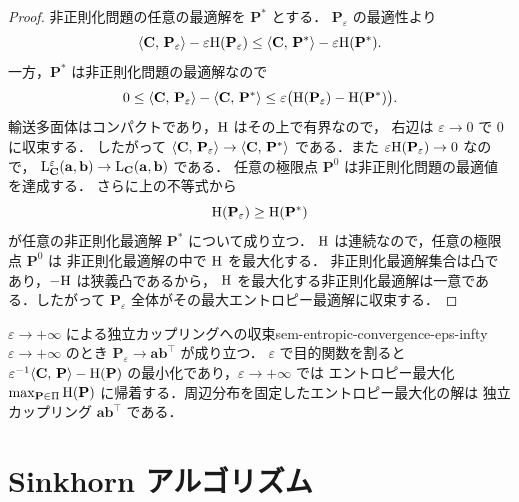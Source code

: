 \begin{proof}
  非正則化問題の任意の最適解を $\mathbf{P}^*$ とする．
  $\mathbf{P}_\varepsilon$ の最適性より
  \[
    \langle \mathbf{C},\, \mathbf{P}_\varepsilon \rangle
    - \varepsilon\mathrm{H}(\mathbf{P}_\varepsilon)
    \leq
    \langle \mathbf{C},\, \mathbf{P}^* \rangle
    - \varepsilon\mathrm{H}(\mathbf{P}^*).
  \]
  一方，$\mathbf{P}^*$ は非正則化問題の最適解なので
  \[
    0
    \leq
    \langle \mathbf{C},\, \mathbf{P}_\varepsilon \rangle
    - \langle \mathbf{C},\, \mathbf{P}^* \rangle
    \leq
    \varepsilon\bigl(\mathrm{H}(\mathbf{P}_\varepsilon)-\mathrm{H}(\mathbf{P}^*)\bigr).
  \]
  輸送多面体はコンパクトであり，$\mathrm{H}$ はその上で有界なので，
  右辺は $\varepsilon \to 0$ で $0$ に収束する．
  したがって
  $\langle \mathbf{C},\, \mathbf{P}_\varepsilon \rangle
  \to \langle \mathbf{C},\, \mathbf{P}^* \rangle$ である．また
  $\varepsilon\mathrm{H}(\mathbf{P}_\varepsilon) \to 0$ なので，
  $\mathrm{L}_{\mathbf{C}}^\varepsilon(\mathbf{a},\mathbf{b})
  \to \mathrm{L}_{\mathbf{C}}(\mathbf{a},\mathbf{b})$ である．
  任意の極限点 $\mathbf{P}^0$ は非正則化問題の最適値を達成する．
  さらに上の不等式から
  \[
    \mathrm{H}(\mathbf{P}_\varepsilon) \geq \mathrm{H}(\mathbf{P}^*)
  \]
  が任意の非正則化最適解 $\mathbf{P}^*$ について成り立つ．
  $\mathrm{H}$ は連続なので，任意の極限点 $\mathbf{P}^0$ は
  非正則化最適解の中で $\mathrm{H}$ を最大化する．
  非正則化最適解集合は凸であり，$-\mathrm{H}$ は狭義凸であるから，
  $\mathrm{H}$ を最大化する非正則化最適解は一意である．したがって
  $\mathbf{P}_\varepsilon$ 全体がその最大エントロピー最適解に収束する．
\end{proof}

\begin{remark}{$\varepsilon \to +\infty$ による独立カップリングへの収束}{sem-entropic-convergence-eps-infty}
  $\varepsilon \to +\infty$ のとき
  $\mathbf{P}_\varepsilon \to \mathbf{a}\mathbf{b}^\top$ が成り立つ．
  $\varepsilon$ で目的関数を割ると
  $\varepsilon^{-1}\langle \mathbf{C},\, \mathbf{P} \rangle - \mathrm{H}(\mathbf{P})$
  の最小化であり，$\varepsilon \to +\infty$ では
  エントロピー最大化
  $\max_{\mathbf{P} \in \Pi} \mathrm{H}(\mathbf{P})$
  に帰着する．周辺分布を固定したエントロピー最大化の解は
  独立カップリング $\mathbf{a}\mathbf{b}^\top$ である．
\end{remark}

\section{Sinkhorn アルゴリズム}
\label{sec:sem-sinkhorn}


